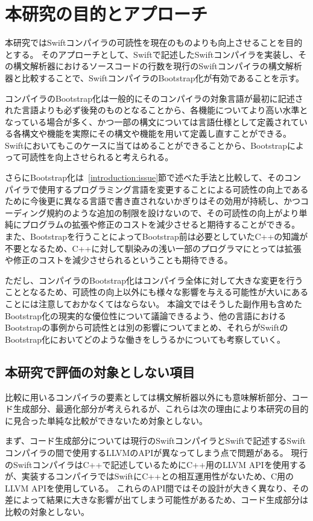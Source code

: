 \section{本研究の目的とアプローチ}
\label{introduction:purpose}

本研究ではSwiftコンパイラの可読性を現在のものよりも向上させることを目的とする。
そのアプローチとして、Swiftで記述したSwiftコンパイラを実装し、その構文解析器におけるソースコードの行数を現行のSwiftコンパイラの構文解析器と比較することで、SwiftコンパイラのBootstrap化が有効であることを示す。

コンパイラのBootstrap化は一般的にそのコンパイラの対象言語が最初に記述された言語よりも必ず後発のものとなることから、各機能についてより高い水準となっている場合が多く、かつ一部の構文については言語仕様として定義されている各構文や機能を実際にその構文や機能を用いて定義し直すことができる。
Swiftにおいてもこのケースに当てはめることができることから、Bootstrapによって可読性を向上させられると考えられる。

さらにBootstrap化は~\ref{introduction:issue}節で述べた手法と比較して、そのコンパイラで使用するプログラミング言語を変更することによる可読性の向上であるために今後更に異なる言語で書き直されないかぎりはその効用が持続し、かつコーディング規約のような追加の制限を設けないので、その可読性の向上がより単純にプログラムの拡張や修正のコストを減少させると期待することができる。
また、Bootstrapを行うことによってBootstrap前は必要としていたC++の知識が不要となるため、C++に対して馴染みの浅い一部のプログラマにとっては拡張や修正のコストを減少させられるということも期待できる。

ただし、コンパイラのBootstrap化はコンパイラ全体に対して大きな変更を行うこととなるため、可読性の向上以外にも様々な影響を与える可能性が大いにあることには注意しておかなくてはならない。
本論文ではそうした副作用も含めたBootstrap化の現実的な優位性について議論できるよう、他の言語におけるBootstrapの事例から可読性とは別の影響についてまとめ、それらがSwiftのBootstrap化においてどのような働きをしうるかについても考察していく。

\subsection{本研究で評価の対象としない項目}

比較に用いるコンパイラの要素としては構文解析器以外にも意味解析部分、コード生成部分、最適化部分が考えられるが、これらは次の理由により本研究の目的に見合った単純な比較ができないため対象としない。

まず、コード生成部分については現行のSwiftコンパイラとSwiftで記述するSwiftコンパイラの間で使用するLLVMのAPIが異なってしまう点で問題がある。
現行のSwiftコンパイラはC++で記述しているためにC++用のLLVM APIを使用するが、実装するコンパイラではSwiftにC++との相互運用性がないため、C用のLLVM APIを使用している。
これらのAPI間ではその設計が大きく異なり、その差によって結果に大きな影響が出てしまう可能性があるため、コード生成部分は比較の対象としない。

